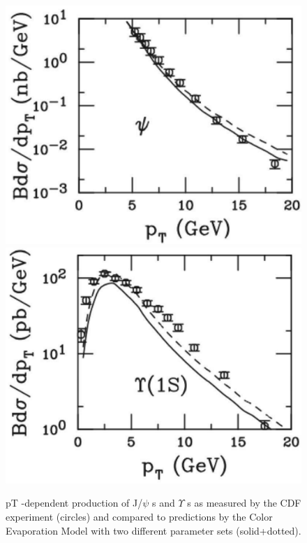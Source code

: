 \begin{figure}
  \includegraphics[width=\smallfigwidth]{chap_QuarkoniaSurvey_figures/JPsiCrossTevtron}
  \includegraphics[width=\smallfigwidth]{chap_QuarkoniaSurvey_figures/YCrossTevtron}
  \caption[J/$\psi$ and $\Upsilon$ cross sections]
   {pT -dependent production of J/$\psi$ s and $\Upsilon$ s as measured by the
     CDF experiment \cite{CDF1, CDF2, CDF3} (circles) and compared to predictions by the
     Color Evaporation Model with two different parameter sets (solid+dotted).}
   \label{fig:QuarkoniaCrossSection}
\end{figure}




